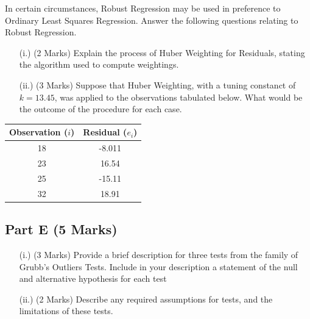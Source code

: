 \documentclass[a4paper,12pt]{article}
\begin{document}
In certain circumstances, Robust Regression may be used in preference to Ordinary Least Squares Regression. Answer the following questions relating to Robust Regression. 

\begin{itemize}
	\item[(i.)] (2 Marks) Explain the process of Huber Weighting for Residuals, stating the algorithm used to compute weightings.
	\item[(ii.)] (3 Marks) Suppose that Huber Weighting, with a tuning constanct of $k=13.45$, was applied to the observations 
	tabulated below. What would be the outcome of the procedure for each case. 
\end{itemize}
\begin{center}
	\begin{tabular}{|c|c|}
		\hline
		Observation ($i$)& Residual ($e_i$)\\ \hline
		
		\phantom{space}	18 	\phantom{space}	 & 	\phantom{space}	-8.011 	\phantom{space}	\\ \hline 
		23 & 16.54 \\ \hline
		25 & -15.11 \\ \hline
		32 & 18.91 \\ \hline
	\end{tabular} 
\end{center}	

	\subsection*{Part E (5 Marks)}
	
	\begin{itemize}
		\item[(i.)] (3 Marks) Provide a brief description for three tests from the family of Grubb's  Outliers Tests. Include in your description a statement of the null and alternative hypothesis for each test
		\item[(ii.)] (2 Marks) Describe any required assumptions for tests, and the limitations of these tests.
	\end{itemize}
	
\end{document}
